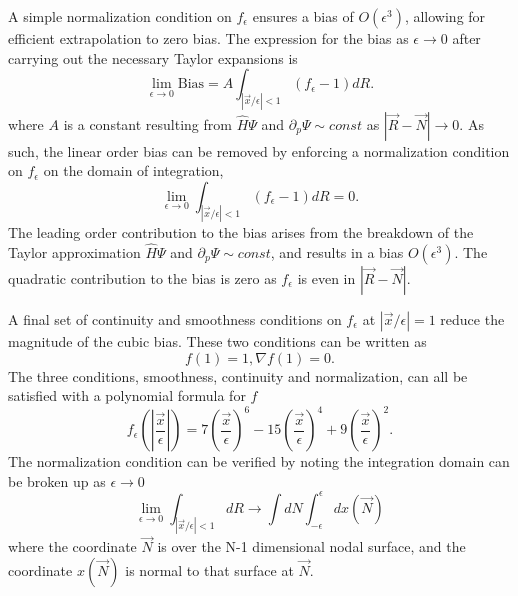 \documentclass[twocolumn]{revtex4-1}
\begin{document}
A simple normalization condition on $f_\epsilon$ ensures a bias of $O(\epsilon^3)$, allowing for efficient extrapolation to zero bias.
The expression for the bias as $\epsilon \rightarrow 0$ after carrying out the necessary Taylor expansions is
$$
\lim_{\epsilon\rightarrow 0}\text{Bias} =  A \int_{|\vec{x}/\epsilon|< 1} (f_\epsilon - 1) dR.
$$
where $A$ is a constant resulting from $\hat{H}\Psi$ and $\partial_p \Psi \sim const$ as $|\vec{R}-\vec{N}|\rightarrow 0$.
As such, the linear order bias can be removed by enforcing a normalization condition on $f_\epsilon$ on the domain of integration, 
$$
\lim_{\epsilon\rightarrow 0} \int_{|\vec{x}/\epsilon|< 1} (f_\epsilon - 1) dR = 0.
$$
The leading order contribution to the bias arises from the breakdown of the Taylor approximation $\hat{H}\Psi$ and $\partial_p \Psi \sim const$, and results in a bias $O(\epsilon^3)$.
The quadratic contribution to the bias is zero as $f_\epsilon$ is even in $|\vec{R}-\vec{N}|$.

A final set of continuity and smoothness conditions on $f_\epsilon$ at $|\vec{x}/\epsilon| = 1$ reduce the magnitude of the cubic bias.
These two conditions can be written as 
$$
f(1) = 1, \nabla f(1) = 0.
$$
The three conditions, smoothness, continuity and normalization, can all be satisfied with a polynomial formula for $f$
$$
f_\epsilon(|\frac{\vec{x}}{\epsilon}|) = 7(\frac{\vec{x}}{\epsilon})^6 - 15(\frac{\vec{x}}{\epsilon})^4 + 9(\frac{\vec{x}}{\epsilon})^2.
$$
The normalization condition can be verified by noting the integration domain can be broken up as $\epsilon \rightarrow 0$
$$
\lim_{\epsilon\rightarrow 0} \int_{|\vec{x}/\epsilon|< 1}  dR  \rightarrow \int dN \int_{-\epsilon}^{\epsilon} dx(\vec{N})
$$
where the coordinate $\vec{N}$ is over the N-1 dimensional nodal surface, and the coordinate $x(\vec{N})$ is normal to that surface at $\vec{N}$.
\end{document}
